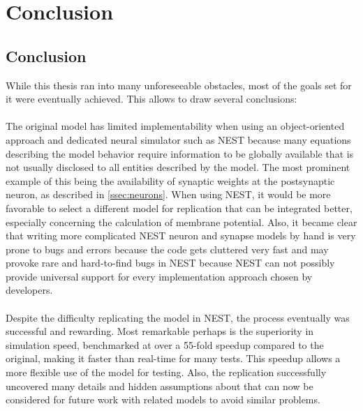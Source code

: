 
\chapter{Conclusion} %

\label{Chapter6} %


\section{Conclusion}
While this thesis ran into many unforeseeable obstacles, most of the goals set for it were eventually achieved. This allows to draw several conclusions:
\\ \ \\
The original model has limited implementability when using an object-oriented approach and dedicated neural simulator such as NEST because many equations describing the model behavior require information to be globally available that is not usually disclosed to all entities described by the model. The most prominent example of this being the availability of synaptic weights at the postsynaptic neuron, as described in \ref{ssec:neurons}. When using NEST, it would be more favorable to select a different model for replication that can be integrated better, especially concerning the calculation of membrane potential. Also, it became clear that writing more complicated NEST neuron and synapse models by hand is very prone to bugs and errors because the code gets cluttered very fast and may provoke rare and hard-to-find bugs in NEST because NEST can not possibly provide universal support for every implementation approach chosen by developers.
\\ \ \\
Despite the difficulty replicating the model in NEST, the process eventually was successful and rewarding. Most remarkable perhaps is the superiority in simulation speed, benchmarked at over a 55-fold speedup compared to the original, making it faster than real-time for many tests. This speedup allows a more flexible use of the model for testing. Also, the replication successfully uncovered many details and hidden assumptions about \parencite{klampfl_maass_2013} that can now be considered for future work with related models to avoid similar problems.

